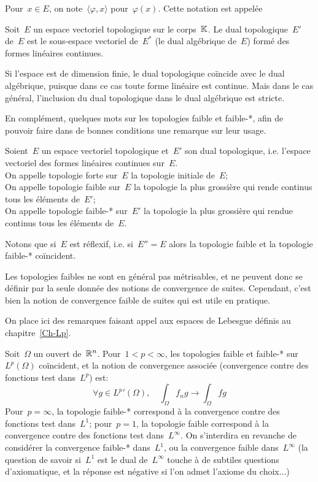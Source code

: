 \medskip
Pour~$x \in E$, on note~$\langle\varphi,x\rangle$ pour~$\varphi(x)$.
Cette notation est appelée 

\medskip
\begin{definition}
Soit~$E$ un espace vectoriel topologique sur le corps~$\mathbb K$.
Le dual topologique~$E'$ de~$E$ est le sous-espace vectoriel de~$E^*$ (le dual algébrique de~$E$) formé des formes linéaires continues.
\end{definition}
Si l'espace est de dimension finie, le dual topologique coïncide avec le dual algébrique, puisque dans ce cas toute forme linéaire est continue.
Mais dans le cas général, l'inclusion du dual topologique dans le dual algébrique est stricte.
\begin{remarque}
En complément, quelques mots sur les topologies faible et faible-*, afin de pouvoir faire dans de bonnes conditions une remarque sur leur usage.
\begin{definition}
Soient~$E$ un espace vectoriel topologique et~$E'$ son dual topologique, i.e. l'espace vectoriel des formes linéaires continues sur~$E$.\\
On appelle topologie forte sur~$E$ la topologie initiale de~$E$;\\
On appelle topologie faible sur~$E$ la topologie la plus grossière qui rende continus tous les éléments de~$E'$;\\
On appelle topologie faible-* sur~$E'$ la topologie la plus grossière qui rendue continus tous les éléments de~$E$.
\end{definition}
Notons que si~$E$ est réflexif, i.e. si~$E''=E$ alors la topologie faible et la topologie faible-* coïncident.

\medskip
Les topologies faibles ne sont en général pas métrisables, et ne peuvent donc se définir par la seule donnée des notions de convergence de suites. Cependant, c'est bien la notion de convergence faible de suites qui est utile en pratique.

\medskip
On place ici des remarques faisant appel aux espaces de Lebesgue définis au chapitre~\ref{Ch-Lp}.

Soit~$\Omega$ un ouvert de~$\mathbb R^n$. Pour~$1<p<\infty$, les topologies faible et faible-* sur~$L^p(\Omega)$ coïncident, et la notion de convergence associée (convergence contre des fonctions test dans~$L^p$) est:
\begin{equation*}
\forall g\in {L^p}'(\Omega), \quad \int_\Omega f_ng \longrightarrow \int_\Omega fg
\end{equation*}
Pour~$p=\infty$, la topologie faible-* correspond à la convergence contre des fonctions test dans~$L^1$; pour~$p=1$, la topologie faible correspond à la convergence contre des fonctions test dans~$L^\infty$. 
On s'interdira en revanche de considérer la convergence faible-* dans~$L^1$, ou la convergence faible dans~$L^\infty$ (la question de savoir si~$L^1$ est le dual de~$L^\infty$ touche à de subtiles questions d'axiomatique, et la réponse est négative si l'on admet l'axiome du choix...)


\end{remarque}
